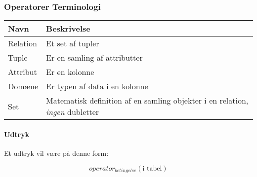 \subsubsection{Operatorer Terminologi}

\begin{tabu}[h]{lX}
	\toprule
	\textbf{Navn} & \textbf{Beskrivelse}\\
	\midrule
	Relation & Et set af tupler\\
	Tuple & Er en samling af attributter\\
	Attribut & Er en kolonne\\
	Domæne & Er typen af data i en kolonne\\
	Set & Matematisk definition af en samling objekter i en relation, \textit{ingen} dubletter\\
	\bottomrule
\end{tabu}

%
%
%
%

\paragraph{Udtryk}

Et udtryk vil være på denne form:

\begin{equation*}
operator_{betingelse}(\text{i tabel})
\end{equation*}

